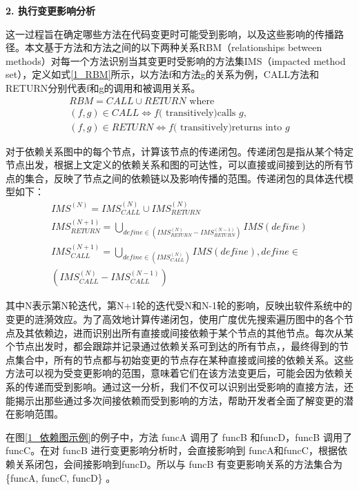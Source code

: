 \noindent \textbf{2. 执行变更影响分析}

这一过程旨在确定哪些方法在代码变更时可能受到影响，以及这些影响的传播路径。本文基于方法和方法之间的以下两种关系RBM（relationships between methods）对每一个方法识别当其变更时受影响的方法集IMS（impacted method set），定义如式\ref{1_RBM}所示，以方法f和方法g的关系为例，CALL方法和RETURN分别代表f和g的调用和被调用关系。
\begin{equation}
\begin{array}{l}
\label{1_RBM}
R B M=C A L L \cup R E T U R N \text { where } \\
(f, g) \in C A L L \Longleftrightarrow f(\text { transitively)calls } g, \\
(f, g) \in R E T U R N \Longleftrightarrow f(\text { transitively)returns into } g
\end{array}
\end{equation}

对于依赖关系图中的每个节点，计算该节点的传递闭包。传递闭包是指从某个特定节点出发，根据上文定义的依赖关系和图的可达性，可以直接或间接到达的所有节点的集合，反映了节点之间的依赖链以及影响传播的范围。传递闭包的具体迭代模型如下：
\begin{equation}
\begin{array}{l}
\label{1_IMS}
I M S^{(N)}=I M S_{C A L L}^{(N)} \cup I M S_{R E T U R N}^{(N)} \\
I M S_{ {RETURN }}^{(N+1)}=\bigcup_{define \in (I M S_{R E T U R N}^{(N)}-I M S_{R E T U R N}^{(N-1)} ) } I M S({ define }) \\
I M S_{C A L L}^{(N+1)}=\bigcup_{ {define } \in (I M S_{C A L L}^{(N)})} I M S( { define }){, define } \in \\
\left(I M S_{C A L L}^{(N)}-I M S_{C A L L}^{(N-1)}\right) 
\end{array}
\end{equation}


其中N表示第N轮迭代，第N+1轮的迭代受N和N-1轮的影响，反映出软件系统中的变更的涟漪效应。为了高效地计算传递闭包，使用广度优先搜索遍历图中的各个节点及其依赖边，进而识别出所有直接或间接依赖于某个节点的其他节点。每次从某个节点出发时，都会跟踪并记录通过依赖关系可到达的所有节点，，最终得到的节点集合中，所有的节点都与初始变更的节点存在某种直接或间接的依赖关系。这些方法可以视为受变更影响的范围，意味着它们在该方法变更后，可能会因为依赖关系的传递而受到影响。通过这一分析，我们不仅可以识别出受影响的直接方法，还能揭示出那些通过多次间接依赖而受到影响的方法，帮助开发者全面了解变更的潜在影响范围。


在图\ref{1_依赖图示例}的例子中，方法 funcA 调用了 funcB 和funcD，funcB 调用了 funcC。在对 funcB 进行变更影响分析时，会直接影响到 funcA和funcC，根据依赖关系闭包，会间接影响到funcD。所以与 funcB 有变更影响关系的方法集合为\{funcA, funcC, funcD\} 。


